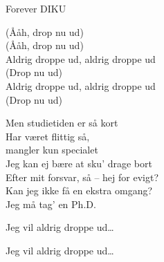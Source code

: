 \begin{song}{Forever DIKU}
  \begin{SBSection*}
    (Ååh, drop nu ud)\\
    (Ååh, drop nu ud)\\
    Aldrig droppe ud, aldrig droppe ud\\
    (Drop nu ud)\\
    Aldrig droppe ud, aldrig droppe ud\\
    (Drop nu ud)
  \end{SBSection*}

  \begin{SBVerse}
    Men studietiden er så kort\\
    Har været flittig så,\\
    mangler kun specialet\\
    Jeg kan ej bære at sku' drage bort\\
    Efter mit forsvar, så -- hej for evigt?\\
    Kan jeg ikke få en ekstra omgang?\\
    Jeg må tag' en Ph.D.
  \end{SBVerse}

  \begin{SBChorus}
            Jeg vil aldrig droppe ud\ldots
  \end{SBChorus}

  \begin{SBChorus}
            Jeg vil aldrig droppe ud\ldots
  \end{SBChorus}
\end{song}